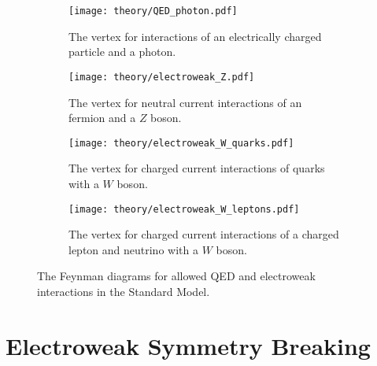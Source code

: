 \begin{figure}[htbp]
 \centering
 \begin{subfigure}[t]{0.23\textwidth}
  \centering
  \texttt{[image: theory/QED\_photon.pdf]}
  \caption[The vertex for interactions of an electrically charged particle and a photon.]{%
   The vertex for interactions of an electrically charged particle and a photon.}
  \label{fig:QED_photon}
 \end{subfigure}%
 \quad
 \begin{subfigure}[t]{0.23\textwidth}
  \centering
  \texttt{[image: theory/electroweak\_Z.pdf]}
  \caption[The vertex for neutral current interactions of an fermion and a $Z$ boson.]{%
   The vertex for neutral current interactions of an fermion and a $Z$ boson.}
  \label{fig:EW_Z}
 \end{subfigure}%
 \quad
 \begin{subfigure}[t]{0.23\textwidth}
  \centering
  \texttt{[image: theory/electroweak\_W\_quarks.pdf]}
  \caption[The vertex for charged current interactions of quarks with a $W$ boson.]{%
   The vertex for charged current interactions of quarks with a $W$ boson.}
  \label{fig:EW_W_quarks}
 \end{subfigure}%
 \quad
 \begin{subfigure}[t]{0.23\textwidth}
  \centering
  \texttt{[image: theory/electroweak\_W\_leptons.pdf]}
  \caption[The vertex for charged current interactions of a charged lepton and neutrino with a $W$ boson.]{%
   The vertex for charged current interactions of a charged lepton and neutrino with a $W$ boson.}
  \label{fig:EW_W_leptons}
 \end{subfigure}%
 \caption[The Feynman diagrams for allowed QED and electroweak interactions.]{%
  The Feynman diagrams for allowed QED and electroweak interactions in the Standard Model.}
 \label{fig:electroweak_vertices}
\end{figure}

\section{Electroweak Symmetry Breaking}\label{section:EWSB}

